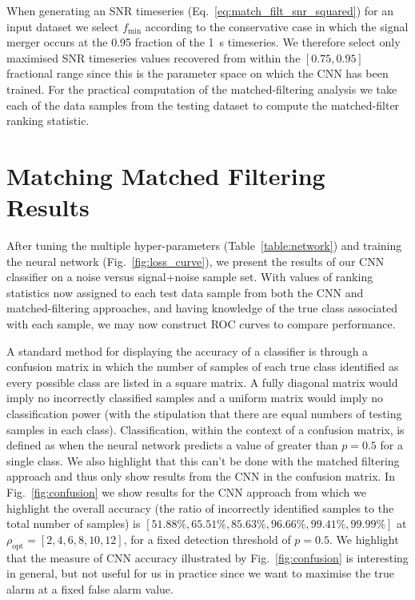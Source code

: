 %
%
When generating an \ac{SNR} timeseries (Eq.~\ref{eq:match_filt_snr_squared}) 
for an input dataset we select $f_{\mathrm{min}}$ according to the 
conservative case in which the signal merger occurs at the 0.95 
fraction of the 1~s timeseries. We therefore select only maximised 
\ac{SNR} timeseries values recovered from within the $[0.75,0.95]$ 
fractional range since this is the parameter space on which the 
\ac{CNN} has been trained. For the practical computation of the 
matched-filtering analysis we take each of the data samples from the 
testing dataset to compute the matched-filter ranking statistic.

%
%

%
%
\section{Matching Matched Filtering Results}
%
%
After tuning the multiple hyper-parameters (Table~\ref{table:network}) 
and training the neural network (Fig.~\ref{fig:loss_curve}), we present 
the results of our \ac{CNN} classifier on a noise versus signal+noise 
sample set. With values of ranking statistics now assigned to each 
test data sample from both the \ac{CNN} and matched-filtering 
approaches, and having knowledge of the true class associated with 
each sample, we may now construct \ac{ROC} curves to compare performance. 

%
%
A standard method for displaying the accuracy of a classifier is 
through a confusion matrix in which the number of samples of each 
true class identified as every possible class are listed in a 
square matrix. A fully diagonal matrix would imply no incorrectly 
classified samples and a uniform matrix would 
imply no classification power (with the 
stipulation that there are equal numbers of testing samples 
in each class). Classification, within the context of a confusion 
matrix, is defined as when the neural network predicts a value 
of greater than $p=0.5$ for a single class. We also highlight that this 
can't be done with the matched filtering approach and thus only 
show results from the \ac{CNN} in the confusion matrix. In
Fig.~\ref{fig:confusion} we show results for the \ac{CNN} approach 
from which we highlight the overall accuracy 
(the ratio of incorrectly identified samples to the total number of 
samples) is $[51.88\%,65.51\%,85.63\%,96.66\%,99.41\%,99.99\%]$ 
at $\rho_{\mathrm{opt}}=[2,4,6,8,10,12]$, for a fixed detection 
threshold of $p=0.5$. 
We highlight that the measure of \ac{CNN} accuracy 
illustrated by Fig.~\ref{fig:confusion} is 
interesting in general, but not useful for 
us in practice since we want to maximise the true alarm at a fixed 
false alarm value.

